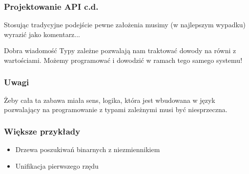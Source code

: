 \documentclass{beamer}
\begin{document}

\begin{frame}
\frametitle{Projektowanie API c.d.}

Stosując tradycyjne podejście pewne założenia musimy
(w najlepszym wypadku) wyrazić jako komentarz...

\begin{block}{Dobra wiadomość}
Typy zależne pozwalają nam traktować dowody na równi z wartościami.
Możemy programować i dowodzić w ramach tego samego systemu!
\end{block}


\end{frame}


\begin{frame}
\frametitle{Uwagi}

Żeby cała ta zabawa miała sens, logika, która jest wbudowana w
język pozwalający na programowanie z typami zależnymi musi być niesprzeczna.

\end{frame}


\begin{frame}
\frametitle{Większe przykłady}

\begin{itemize}

\item Drzewa poszukiwań binarnych z niezmiennikiem
\item Unifikacja pierwszego rzędu
\end{itemize}

\end{frame}
\end{document}
